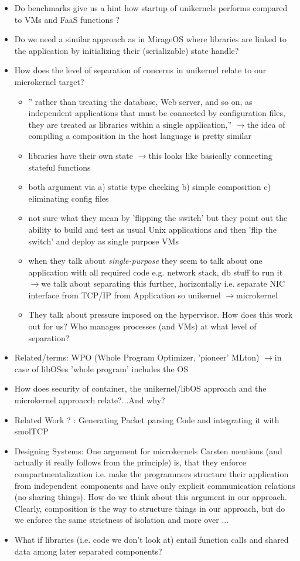 \documentclass{scrartcl}
\newcommand{\means}{$\rightarrow{}$}
\begin{document}
\begin{itemize}
    \item Do benchmarks give us a hint how startup of unikernels performs compared to VMs and FaaS functions ?
    \item Do we need a similar approach as in MirageOS where libraries are linked to the application by initializing their (serializable) state handle?
    \item How does the level of separation of concerns in unikernel relate to our microkernel target? 
    \begin{itemize}
        \item '' rather than treating the database, Web server, and so on, as independent applications that must be connected by configuration files, they are treated as libraries within a single application,'' \means the idea of compiling a composition in the host language is pretty similar
        \item libraries have their own state \means this looks like basically connecting stateful functions
        \item both argument via a) static type checking b) simple composition c) eliminating config files
        \item not sure what they mean by 'flipping the switch' but they point out the ability to build and test as usual Unix applications and then 'flip the switch' and deploy as single purpose VMs 
        \item when they talk about \textit{single-purpose} they seem to talk about one application with all required code e.g. network stack, db stuff  to run it \means we talk about separating this further, horizontally i.e. separate  NIC interface from TCP/IP from Application  so unikernel \means microkernel 
        \item They talk about pressure imposed on the hypervisor. How does this work out for us? Who manages processes (and VMs) at what level of separation?
    \end{itemize}
    \item Related/terms: WPO (Whole Program Optimizer, 'pioneer' MLton) \means in case of libOSes 'whole program' includes the OS
    \item How does security of container, the unikernel/libOS approach and the microkernel approacch relate?...And why?
    \item Related Work ? : Generating Packet parsing Code and integrating it with smolTCP \cite{GenerateCode}
    \item Designing Systems: One argument for microkernels Carsten mentions (and actually it really follows from the principle) is, that they enforce compartmentalization i.e. make the programmers structure their application from independent components and have only explicit communication relations (no sharing things). How do we think about this argument in our approach. Clearly, composition is the way to structure things in our approach, but do we enforce the same strictness of isolation and more over ...
    \item What if libraries (i.e. code we don't look at) entail function calls and shared data among later separated components?
\end{itemize}
\end{document}
